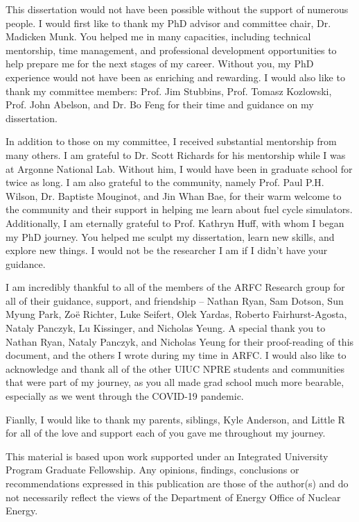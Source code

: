 This dissertation would not have been possible without the support 
of numerous people. I would first like to thank my PhD advisor and 
committee chair, Dr. 
Madicken Munk. You helped me in many capacities, including technical 
mentorship, time management, and professional development opportunities 
to help prepare me for the next stages of my career. Without you, my PhD 
experience would not have been as enriching and rewarding. I would also like 
to thank my committee members: Prof. Jim Stubbins, Prof. Tomasz Kozlowski, 
Prof. John Abelson, and Dr. Bo Feng for their time and guidance on my dissertation. 

In addition to those on my committee, I received substantial mentorship from 
many others. I am grateful to Dr. Scott Richards for his mentorship while I 
was at Argonne National Lab. Without him, I would have been in graduate school 
for twice as long. I am also grateful to the \Cyclus community, namely Prof. 
Paul P.H. Wilson, Dr. Baptiste Mouginot, and Jin Whan Bae, for their warm 
welcome to the \Cyclus community and their support in helping me learn about 
fuel cycle simulators. Additionally, I am eternally grateful to Prof. 
Kathryn Huff, with whom I began my PhD journey. You helped me sculpt my 
dissertation, learn new skills, and explore new things. I would not be 
the researcher I am if I didn't have your guidance. 

I am incredibly thankful to all of the members of the \gls{ARFC} Research 
group for all of their guidance, support, and friendship -- 
Nathan Ryan, Sam Dotson, Sun Myung Park, Zo\"{e} Richter, Luke Seifert, 
Olek Yardas, Roberto Fairhurst-Agosta, Nataly Panczyk, Lu Kissinger, and 
Nicholas Yeung. A special thank you to Nathan Ryan, Nataly Panczyk, and Nicholas 
Yeung for their proof-reading of this document, and the others I wrote during my 
time in \gls{ARFC}. I would also like to acknowledge and thank all of the other 
UIUC NPRE students and communities that were part of my journey, as 
you all made grad school much more bearable, especially as we went through 
the COVID-19 pandemic. 

Fianlly, I would like to thank my parents, siblings, Kyle Anderson, and Little R
for all of the love and support each of you gave me throughout my journey. 


This material is based upon work supported under an Integrated University 
Program Graduate Fellowship. Any opinions, findings, conclusions or 
recommendations expressed in this publication are those of the author(s) 
and do not necessarily reflect the views of the Department of Energy Office 
of Nuclear Energy.